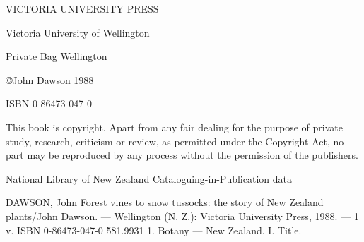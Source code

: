 \thispagestyle{empty}

VICTORIA UNIVERSITY PRESS

Victoria University of Wellington

Private Bag Wellington

©John Dawson 1988

ISBN 0 86473 047 0


This book is copyright. Apart from any fair dealing for the purpose of private study, research, criticism or review, as permitted under the Copyright Act, no part may be reproduced by any process without the permission of the publishers.

National Library of New Zealand
Cataloguing-in-Publication data

DAWSON, John
Forest vines to snow tussocks: the story of New Zealand plants/John Dawson. — Wellington
(N. Z.): Victoria University Press, 1988. — 1 v.
ISBN 0-86473-047-0
581.9931
1. Botany — New Zealand. I. Title.
